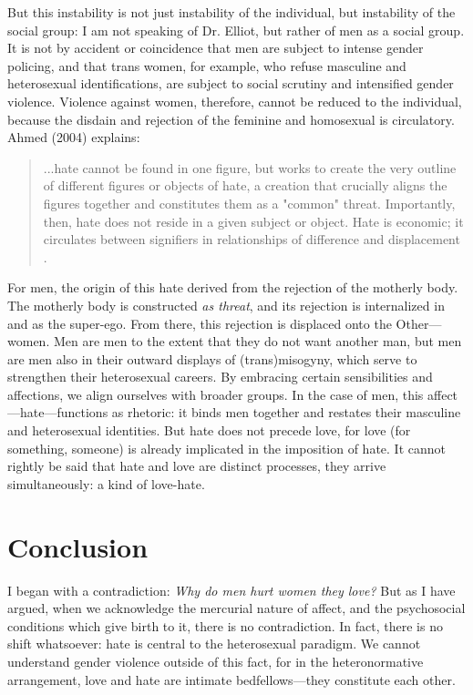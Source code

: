\documentclass[letterpaper,12pt]{turabian-researchpaper}
\begin{document}
But this instability is not just instability of the individual, but instability of the social group: I am not speaking of Dr. Elliot, but rather of men as a social group. It is not by accident or coincidence that men are subject to intense gender policing, and that trans women, for example, who refuse masculine and heterosexual identifications, are subject to social scrutiny and intensified gender violence. Violence against women, therefore, cannot be reduced to the individual, because the disdain and rejection of the feminine and homosexual is circulatory. Ahmed (2004) explains:
\begin{quotation}
	\noindent ...hate cannot be found in one figure, but works to create the very outline of different figures or objects of hate, a creation that crucially aligns the figures together and constitutes them as a "common" threat. Importantly, then, hate does not reside in a given subject or object. Hate is economic; it circulates between signifiers in relationships of difference and displacement \autocite[119]{ahmed_affective_2004}.
\end{quotation}
For men, the origin of this hate derived from the rejection of the motherly body. The motherly body is constructed \textit{as threat}, and its rejection is internalized in and as the super-ego. From there, this rejection is displaced onto the Other---women. Men are men to the extent that they do not want another man, but men are men also in their outward displays of (trans)misogyny, which serve to strengthen their heterosexual careers. By embracing certain sensibilities and affections, we align ourselves with broader groups. In the case of men, this affect---hate---functions as rhetoric: it binds men together and restates their masculine and heterosexual identities. But hate does not precede love, for love (for something, someone) is already implicated in the imposition of hate. It cannot rightly be said that hate and love are distinct processes, they arrive simultaneously: a kind of love-hate.

\section{Conclusion}

I began with a contradiction: \textit{Why do men hurt women they love?} But as I have argued, when we acknowledge the mercurial nature of affect, and the psychosocial conditions which give birth to it, there is no contradiction. In fact, there is no shift whatsoever: hate is central to the heterosexual paradigm. We cannot understand gender violence outside of this fact, for in the heteronormative arrangement, love and hate are intimate bedfellows---they constitute each other.
\end{document}
